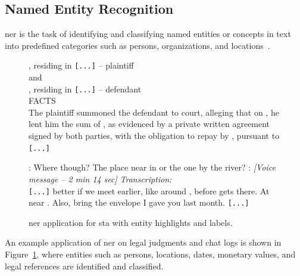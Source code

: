 \subsection{Named Entity Recognition}
\begin{definition}
    \Acf{ner} is the task of identifying and classifying named entities or concepts in text into predefined categories such as persons, organizations, and locations~\cite{entityorientedsearch2018balog,keraghel2024recentadvancesnamedentity,jm3}.
\end{definition}

\begin{figure}[htbp]
\centering
\begin{minipage}[t]{0.48\linewidth}
\small
{}, residing in  \texttt{[...]} -- plaintiff\\
and\\
, residing in  \texttt{[...]} -- defendant\\
FACTS\\
The plaintiff summoned the defendant to court, alleging that on , he lent him the sum of , as evidenced by a private written agreement signed by both parties, with the obligation to repay by , pursuant to  \texttt{[...]}
\label{fig:extract-ner-judgment}
\end{minipage}
\hfill
\begin{minipage}[t]{0.48\linewidth}
\small
\DATE{[2025-07-28 -- 14:15]} : Where though? The place near  in  or the one by the river?
\DATE{[2025-07-29 -- 08:45]} : \textit{[Voice message -- 2 min 14 sec]}
\quad \textit{Transcription:}\\
\quad \texttt{[...]} better if we meet earlier, like around , before  gets there. At  near . Also, bring the envelope I gave you last month.  \texttt{[...]}\\
\label{fig:extract-ner-chat}
\end{minipage}
\caption{\Ac{ner} application for \acl{sta} with entity highlights and labels.}
\label{fig:extracts-ner}
\end{figure}

An example application of \ac{ner} on legal judgments and chat logs is shown in Figure~\ref{fig:extracts-ner}, where entities such as persons, locations, dates, monetary values, and legal references are identified and classified.



